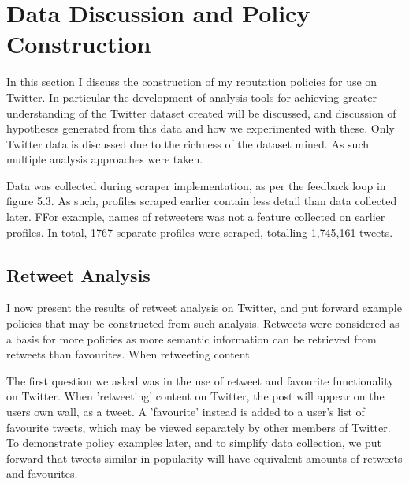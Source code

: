 \chapter{Data Discussion and Policy Construction}\label{C:us}

In this section I discuss the construction of my reputation policies for use on Twitter. In particular the development of analysis tools for achieving greater understanding of the Twitter dataset created will be discussed, and discussion of hypotheses generated from this data and how we experimented with these. Only Twitter data is discussed due to the richness of the dataset mined. As such multiple analysis approaches were taken. 

Data was collected during scraper implementation, as per the feedback loop in figure 5.3. As such, profiles scraped earlier contain less detail than data collected later. FFor example, names of retweeters was not a feature collected on earlier profiles. In total, 1767 separate profiles were scraped, totalling 1,745,161 tweets. 





\section{Retweet Analysis}

I now present the results of retweet analysis on Twitter, and put forward example policies that may be constructed from such analysis. Retweets were considered as a basis for more policies as more semantic information can be retrieved from retweets than favourites. When retweeting content 

The first question we asked was in the use of retweet and favourite functionality on Twitter. When 'retweeting' content on Twitter, the post will appear on the users own wall, as a tweet. A 'favourite' instead is added to a user's list of favourite tweets, which may be viewed separately by other members of Twitter. To demonstrate policy examples later, and to simplify data collection, we put forward that tweets similar in popularity will have equivalent amounts of retweets and favourites. 

